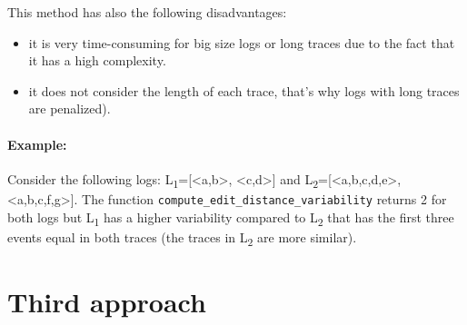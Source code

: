 \documentclass[12pt]{article}
\begin{document}
This method has also the following disadvantages:
\begin{itemize}
	\item it is very time-consuming for big size logs or long traces due to the fact that it has a high complexity.
	\item it does not consider the length of each trace, that's why logs with long traces are penalized).\label{ref:cons2}
\end{itemize}  

\paragraph*{Example:} Consider the following logs: L\textsubscript{1}=[\textless a,b\textgreater, \textless c,d\textgreater] and L\textsubscript{2}=[\textless a,b,c,d,e\textgreater,\\ \textless a,b,c,f,g\textgreater]. The function \texttt{compute\_edit\_distance\_variability} returns 2 for both logs but L\textsubscript{1} has a higher variability compared to L\textsubscript{2} that has the first three events equal in both traces (the traces in L\textsubscript{2} are more similar). 
\newpage
\section*{Third approach}\label{section:third}
\end{document}
